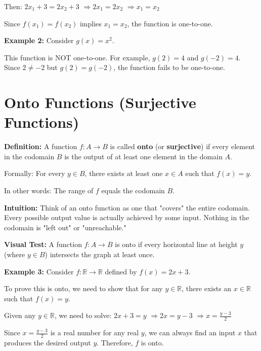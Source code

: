 \documentclass[12pt]{article}
\begin{document}
Then: $2x_1 + 3 = 2x_2 + 3$
$\Rightarrow 2x_1 = 2x_2$
$\Rightarrow x_1 = x_2$

Since $f(x_1) = f(x_2)$ implies $x_1 = x_2$, the function is one-to-one.

\textbf{Example 2:} Consider $g(x) = x^2$.

This function is NOT one-to-one. For example, $g(2) = 4$ and $g(-2) = 4$. Since $2 \neq -2$ but $g(2) = g(-2)$, the function fails to be one-to-one.

\vspace{1cm}
\newpage

\section{Onto Functions (Surjective Functions)}

\textbf{Definition:} A function $f: A \to B$ is called \textbf{onto} (or \textbf{surjective}) if every element in the codomain $B$ is the output of at least one element in the domain $A$.

Formally: For every $y \in B$, there exists at least one $x \in A$ such that $f(x) = y$.

In other words: The range of $f$ equals the codomain $B$.

\vspace{0.7cm}

\textbf{Intuition:} Think of an onto function as one that "covers" the entire codomain. Every possible output value is actually achieved by some input. Nothing in the codomain is "left out" or "unreachable."

\textbf{Visual Test:} A function $f: A \to B$ is onto if every horizontal line at height $y$ (where $y \in B$) intersects the graph at least once.

\vspace{0.7cm}

\textbf{Example 3:} Consider $f: \mathbb{R} \to \mathbb{R}$ defined by $f(x) = 2x + 3$.

To prove this is onto, we need to show that for any $y \in \mathbb{R}$, there exists an $x \in \mathbb{R}$ such that $f(x) = y$.

Given any $y \in \mathbb{R}$, we need to solve: $2x + 3 = y$
$\Rightarrow 2x = y - 3$
$\Rightarrow x = \frac{y - 3}{2}$

Since $x = \frac{y - 3}{2}$ is a real number for any real $y$, we can always find an input $x$ that produces the desired output $y$. Therefore, $f$ is onto.
\end{document}
